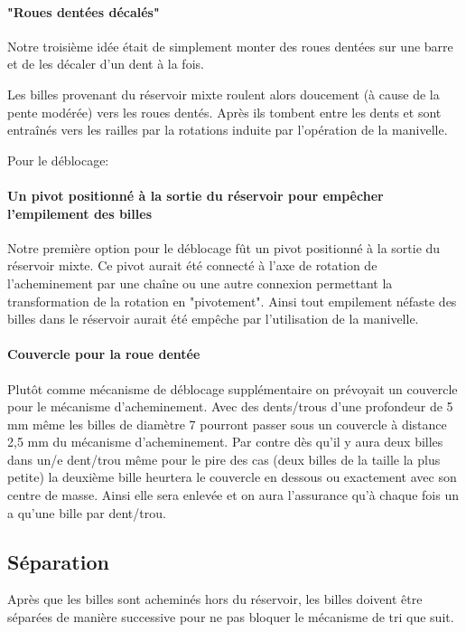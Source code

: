 \paragraph{"Roues dentées décalés"}
Notre troisième idée était de simplement monter des roues dentées sur une barre et de les décaler d'un dent à la fois.


Les billes provenant du réservoir mixte roulent alors doucement (à cause de la pente modérée)  vers les roues dentés. Après ils tombent entre les dents et sont entraînés vers les railles par la rotations induite par l'opération de la manivelle.


Pour le déblocage:
\paragraph{Un pivot positionné à la sortie du réservoir pour empêcher l'empilement des billes} 
Notre première option pour le déblocage fût un pivot positionné à la sortie du réservoir mixte. Ce pivot aurait été connecté à l'axe de rotation de l'acheminement par une chaîne ou une autre connexion permettant la transformation de la rotation en "pivotement". Ainsi tout empilement néfaste des billes dans le réservoir aurait été empêche par l'utilisation de la manivelle.


\paragraph{Couvercle pour la roue dentée}
Plutôt comme mécanisme de déblocage supplémentaire on prévoyait un couvercle pour le mécanisme d'acheminement. Avec des dents/trous d'une profondeur de 5 mm même les billes de diamètre 7 pourront passer sous un couvercle à distance 2,5 mm du mécanisme d'acheminement. Par contre dès qu'il y aura deux billes dans un/e dent/trou même pour le pire des cas (deux billes de la taille la plus petite) la deuxième bille heurtera le couvercle en dessous ou exactement avec son centre de masse. Ainsi elle sera enlevée et on aura l'assurance qu'à chaque fois un a qu'une bille par dent/trou.


\subsection{Séparation}
Après que les billes sont acheminés hors du réservoir, les billes doivent être séparées de manière successive pour ne pas bloquer le mécanisme de tri que suit.

